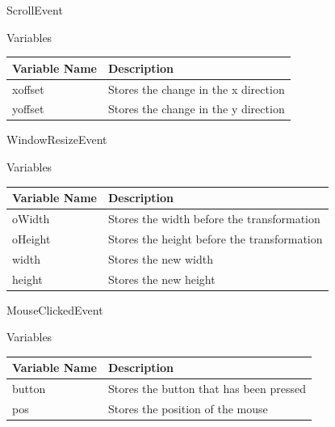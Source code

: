 \documentclass{article}
\begin{document}
                ScrollEvent
                \begin{center}
                    Variables
                    \begin{tabular}{ | m{} | m{} | }
                        \hline
                        \textbf{Variable Name} & \textbf{Description} \\
                        \hline
                        xoffset & Stores the change in the x direction \\
                        \hline
                        yoffset & Stores the change in the y direction \\
                        \hline
                    \end{tabular}
                \end{center}
                WindowResizeEvent
                \begin{center}
                    Variables
                    \begin{tabular}{ | m{} | m{} | }
                        \hline
                        \textbf{Variable Name} & \textbf{Description} \\
                        \hline
                        oWidth & Stores the width before the transformation \\
                        \hline
                        oHeight & Stores the height before the transformation \\
                        \hline
                        width & Stores the new width \\
                        \hline
                        height & Stores the new height \\
                        \hline
                    \end{tabular}
                \end{center}
                MouseClickedEvent
                \begin{center}
                    Variables
                    \begin{tabular}{ | m{} | m{} | }
                        \hline
                        \textbf{Variable Name} & \textbf{Description} \\
                        \hline
                        button & Stores the button that has been pressed \\
                        \hline
                        pos & Stores the position of the mouse \\
                        \hline
                    \end{tabular}
                \end{center}
\end{document}
